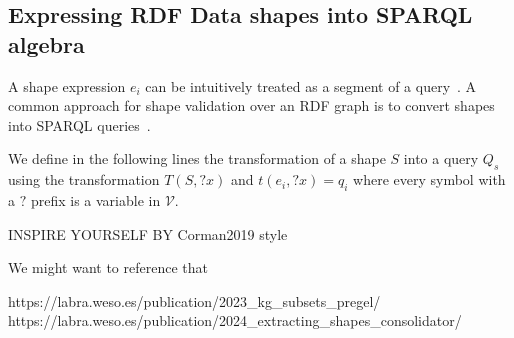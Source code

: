 \subsection{Expressing RDF Data shapes into SPARQL algebra}\label{sec:shape2SPARQL}

A shape expression $e_i$ can be intuitively treated as a segment of a query~\cite{delva2023}.
A common approach for shape validation over an RDF graph is to convert shapes into SPARQL queries~\cite{labragayo2017validatingdescribinglinkeddata, Corman2019,Prestamo2023, spapeExpressionConvert}.~

\iffalse
For our query-shape containment problem we are looking into transforming our shapes $S$ into queries $Q_s =  q_i \bowtie q_{i+1} ... \bowtie q_n$ by transforming each $e_i$ of $s$ in a $q_i$.
We are looking into creating a query $Q_s$ with the following property
\begin{equation}\label{eq:shapeSPARQL}
   G \models S \iff [\![ Q_s ]\!]^{G} =  G
\end{equation}
For every $G$.

Our definition is aimed at close shapes because we are not looking into validating data but into containment since an open shape can validate 
For any $G$ that contains at least the constraint specified by $S$, we simplify the fact that if we neglect negative statements, any query can be contained in such a shape.
The intuition behind equation~\ref{eq:shapeSPARQL} is that we are looking to produce a query that simulates the behavior of a shape.
It is natural from the definition of shape languages. It has been shown in the literature that shape constraint can be transformed into a combination of triple patterns, filter expressions, and other SPARQL fragments.
Thus, if we can establish a mapping between the constraints of $S$ in terms of query fragments, a query targeting $G$ should return $G$ if every triple of the 
$G$ respects the constraint of the shape.
\fi
We define in the following lines the transformation of a shape $S$ into a query $Q_s$ using the transformation $T(S,?x)$ and $t(e_i, ?x) = q_i$ where every 
symbol with a $?$ prefix is a variable in $\mathcal{V}$.


\iffalse
INSPIRE YOURSELF BY Corman2019 style

We might want to reference that

https://labra.weso.es/publication/2023_kg_subsets_pregel/
https://labra.weso.es/publication/2024_extracting_shapes_consolidator/


